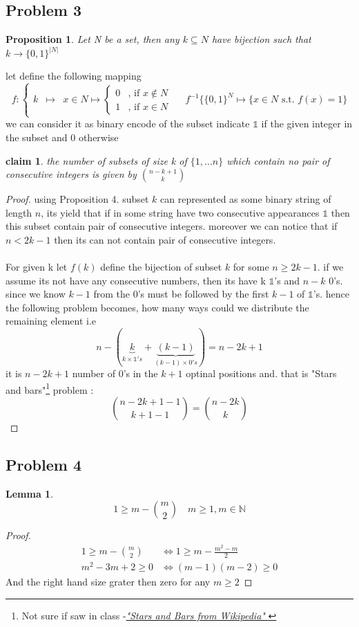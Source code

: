 \documentclass[12pt]{article}
\newtheorem*{claim*}{claim}
\newtheorem{lemma}[theorem]{Lemma}
\newtheorem{prop}{Proposition}
\begin{document}
\subsection*{Problem 3}
\begin{prop}
 Let N be a set, then any $k\subseteq N $ have  bijection such that
$k\to\{0,1\}^{|N|}$
\end{prop}
let define the following mapping 
\[
f:\left\{\begin{array}{ccc}k&\mapsto&x\in N\mapsto\left\{\begin{array}{ll}0&\textrm{, if }x\notin N\\1&\textrm{, if }x\in N\end{array}\right.\end{array}\right.\quad f^{-1}\{\{0,1\}^N \mapsto \{x\in N\textrm{ s.t. }f(x)=1\}
\]
we can consider it as binary encode of the subset indicate $\mathds{1}$ if the given integer in the subset and 0 otherwise
\begin{claim*} the number of subsets of size k of $\{1,\dots n\}$ which contain no pair of
consecutive integers is given by $n-k+1 \choose k$
\end{claim*}
\begin{proof}
 using Proposition 4. subset $k$ can represented as some binary string of length $n$, its yield that if in some  string have  two consecutive appearances $\mathds{1}$ then this subset contain pair of
consecutive integers. moreover we can notice that if  $n< 2k-1$ then its can not contain pair of
consecutive integers.\\\\
For given k  let $f(k)$  define the bijection of subset $k$ for some $n\ge 2k-1$. if we assume its not have any consecutive numbers, then its have k  $\mathds{1}$'s and $n-k$ 0's. since we know $k-1$ from the 0's must be followed by the first $k-1$ of $\mathds{1}$'s. hence the following problem becomes, how many ways could we distribute the remaining element i.e\[ 
n-(\underbrace{k}_{k\times \mathds{1}'s} + \underbrace{(k-1)}_{(k-1) \times 0's})=n-2k+1 
\]
it is $n-2k+1$ number of 0's in the $k+1$ optinal positions and. that is  "Stars and bars"\footnote{ Not sure if saw in class -\href{https://en.wikipedia.org/wiki/Stars_and_bars_(combinatorics)}{\emph{"Stars and Bars from Wikipedia"}
}} problem  :
\[\binom{n-2k+1-1}{k+1-1}=\binom{n-2k}{k}
\]  
\end{proof}
\subsection*{Problem 4}
\begin{lemma}
\[1\ge m-{m \choose 2} \quad m\ge 1, m\in \mathbb{N}
\]\end{lemma}
\begin{proof}

\begin{align*}
1\ge m-{m \choose 2} &\Leftrightarrow 1\ge m-\frac{m^2-m}{2}
\\
m^2-3m+2\ge 0 &\Leftrightarrow (m-1)(m-2)\ge 0
\end{align*}
And the right hand size grater then zero for any $m\ge 2$
\end{proof}
\end{document}
